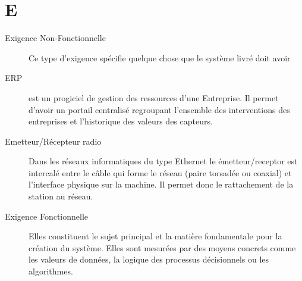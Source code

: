\section{E}

\begin{description}

\item[Exigence Non-Fonctionnelle] Ce type d'exigence spécifie quelque chose que 
le système livré doit avoir

\item[ERP] est un progiciel de gestion des ressources d'une Entreprise. 
Il permet d'avoir un portail centralisé regroupant l'ensemble des interventions 
des entreprises et l'historique des valeurs des capteurs.

\item[Emetteur/Récepteur radio]
Dans les réseaux informatiques du type Ethernet le émetteur/receptor est intercalé entre le câble qui forme le réseau (paire torsadée ou coaxial) et l'interface physique sur la machine. Il permet donc le rattachement de la station au réseau.

\item[Exigence Fonctionnelle]
Elles constituent le sujet principal et la matière fondamentale pour la création du système. Elles sont mesurées par des moyens concrets comme les valeurs de données, la logique des processus décisionnels ou les algorithmes.




\end{description}
